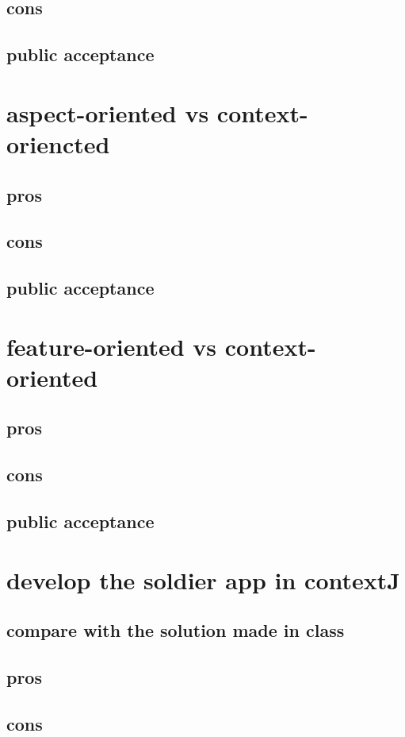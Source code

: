 \documentclass[11pt]{article}
\begin{document}
\subsection{cons}
\label{sec:org68f9bea}
\subsection{public acceptance}
\label{sec:orgbb758bc}
\section{aspect-oriented vs context-oriencted}
\label{sec:org6790733}
\subsection{pros}
\label{sec:orgc156bd0}
\subsection{cons}
\label{sec:orgdd9f669}
\subsection{public acceptance}
\label{sec:org99b87bf}
\section{feature-oriented vs context-oriented}
\label{sec:org72d320e}
\subsection{pros}
\label{sec:org19f0d1e}
\subsection{cons}
\label{sec:org9838e9d}
\subsection{public acceptance}
\label{sec:org6b12053}
\section{develop the soldier app in contextJ}
\label{sec:org1d46151}
\subsection{compare with the solution made in class}
\label{sec:org50cc8df}
\subsection{pros}
\label{sec:orgb02144d}
\subsection{cons}
\label{sec:orge242f84}
\end{document}
